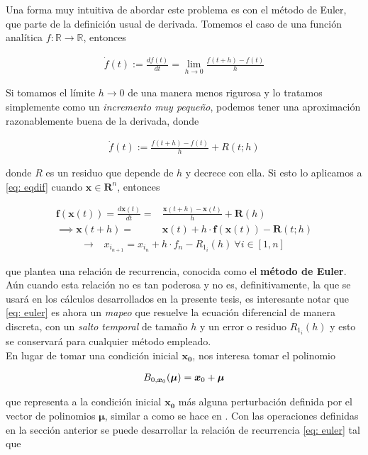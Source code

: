 Una forma muy intuitiva de abordar este problema es con el método de Euler, que parte de la definición usual de derivada. Tomemos el caso de una función analítica $f: \mathbb{R}  \to \mathbb{R}$, entonces

\begin{align}
 \dot{f}(t) := \frac{df(t)}{dt} = \lim_{h\to 0} \frac{ f(t+h) - f(t) }{h}
 \label{eq: deriv}
\end{align}

Si tomamos el límite $h \to 0$ de una manera menos rigurosa y lo tratamos simplemente como un \textit{incremento muy pequeño}, podemos tener una aproximación razonablemente buena de la derivada, donde

\begin{align*}
\dot{f}(t) := \frac{ f(t+h) - f(t) }{h} + R(t;h)
\end{align*}

donde $R$ es un residuo que depende de $h$ y decrece con ella. Si esto lo aplicamos a \ref{eq: eqdif} cuando $\textbf{x} \in \bm{R}^n$, entonces

\begin{align}
 \bm{f}(\bm{x}(t)) = \frac{d\bm{x}(t)}{dt} =& \frac{ \bm{x}(t+h) - \bm{x}(t) }{h}+ \bm{R}(h)\\
 \implies \bm{x}(t+h) =& \bm{x}(t) + h\cdot \bm{f}(\bm{x}(t)) - \bm{R}(t;h)
 \label{eq: poli1g}
\end{align}
\begin{align}
 \to \ & x_{i_{n+1}} = x_{i_n} + h\cdot f_n - R_{1_i}(h) \ \forall i \in [1,n]
 \label{eq: euler}
\end{align}

que plantea una relación de recurrencia, conocida como el \textbf{método de Euler}. Aún cuando esta relación no es tan poderosa y no es, definitivamente, la que se usará en los cálculos desarrollados en la presente tesis, es interesante notar que \ref{eq: euler} es ahora un \textit{mapeo} que resuelve la ecuación diferencial de manera discreta, con un \textit{salto temporal} de tamaño $h$ y un error o residuo $R_{1_i}(h)$ y esto se conservará para cualquier método empleado.\\

En lugar de tomar una condición inicial $\bm{x_0}$, nos interesa tomar el polinomio

\begin{align*}
 B_{0,\bm{x}_0}(\bm{\mu}) = \bm{x}_0 + \bm{\mu}
\end{align*}

que representa a la condición inicial $\bm{x_0}$ más alguna perturbación definida  por el vector de polinomios $\bm{\mu}$, similar a como se hace en \cite{Perez2015}. Con las operaciones definidas en la sección anterior se puede desarrollar la relación de recurrencia \ref{eq: euler} tal que 

